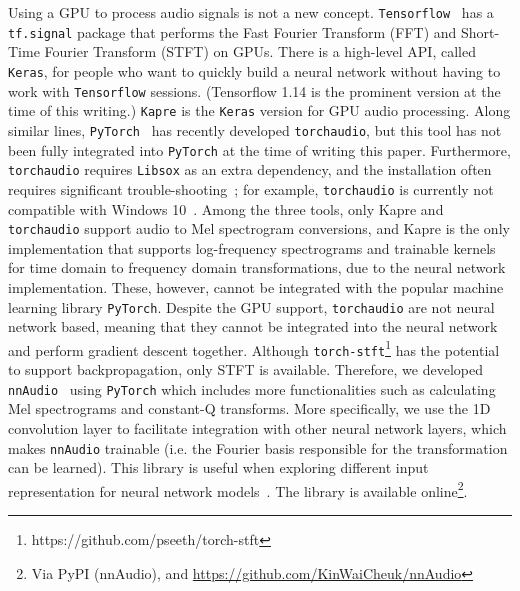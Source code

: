 \documentclass{ieeeaccess}
\newcommand{\nbh}[1]{\texttt{#1}}
\begin{document}
Using a GPU to process audio signals is not a new concept. \nbh{Tensorflow}~\cite{Tensorflow2015-whitepaper} has a \nbh{tf.signal} package that performs the Fast Fourier Transform (FFT) and Short-Time Fourier Transform (STFT) on GPUs. There is a high-level API, called \nbh{Keras}, for people who want to quickly build a neural network without having to work with \nbh{Tensorflow} sessions. (Tensorflow 1.14 is the prominent version at the time of this writing.) \nbh{Kapre} \cite{choi2017kapre} is the \nbh{Keras} version for GPU audio processing. Along similar lines, \nbh{PyTorch}~\cite{paszke2017automatic} has recently developed \nbh{torchaudio}, but this tool has not been fully integrated into \nbh{PyTorch} at the time of writing this paper. Furthermore, \nbh{torchaudio} requires \nbh{Libsox} as an extra dependency, and the installation often requires significant trouble-shooting~\cite{torchaudio_mac}; for example, \nbh{torchaudio} is currently not compatible with Windows 10~\cite{torchaudio_win}. Among the three tools, only Kapre and \nbh{torchaudio} support audio to Mel spectrogram conversions, and Kapre is the only implementation that supports log-frequency spectrograms and trainable kernels for time domain to frequency domain transformations, due to the neural network implementation. These, however, cannot be integrated with the popular machine learning library \nbh{PyTorch}. Despite the GPU support, \nbh{torchaudio} are not neural network based, meaning that they cannot be integrated into the neural network and perform gradient descent together. Although \nbh{torch-stft}\footnote{https://github.com/pseeth/torch-stft} has the potential to support backpropagation, only STFT is available. Therefore, we developed \nbh{nnAudio}~\cite{nnAudio} using \nbh{PyTorch} which includes more functionalities such as calculating Mel spectrograms and constant-Q transforms. More specifically, we use the 1D convolution layer to facilitate integration with other neural network layers, which makes \nbh{nnAudio} trainable (i.e. the Fourier basis responsible for the transformation can be learned). This library is useful when exploring different input representation for neural network models~\cite{balamurali2019toward,kelz2016potential}.
The library is available online\footnote{\label{nnAudio} Via PyPI (nnAudio), and \url{https://github.com/KinWaiCheuk/nnAudio}}.
\end{document}

